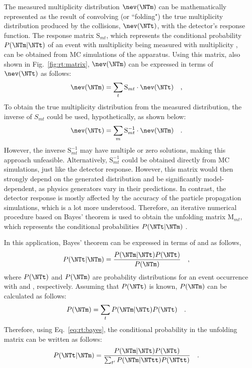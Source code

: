 The measured multiplicity distribution $\nev(\NTm)$ can be mathematically represented as the result of convolving (or ``folding") the true multiplicity distribution produced by the collisions, $\nev(\NTt)$, with the detector's response function. The response matrix $\mathrm{S}_{mt}$, which represents the conditional probability $P(\NTm | \NTt)$ of an event with multiplicity \NTt being measured with multiplicity \NTm, can be obtained from MC simulations of the apparatus. Using this matrix, also shown in Fig.~\ref{fig:rt:matrix}, $\nev(\NTm)$ can be expressed in terms of $\nev(\NTt)$ as follows:
\begin{align}
\nev(\NTm) = \sum_t \mathrm{S}_{mt} \cdot \nev(\NTt) \quad ,
\end{align}
To obtain the true multiplicity distribution from the measured distribution, the inverse of $S_{mt}$ could be used, hypothetically, as shown below:
\begin{align}
\nev ( \NTt ) = \sum_m \mathrm{S}_{mt}^{-1} \cdot \nev ( \NTm ) \quad .
\end{align}
However, the inverse $\mathrm{S}_{mt}^{-1}$ may have multiple or zero solutions, making this approach unfeasible. Alternatively, $\mathrm{S}_{mt}^{-1}$ could be obtained directly from MC simulations, just like the detector response. However, this matrix would then strongly depend on the generated \NTt distribution and be significantly model-dependent, as physics generators vary in their \NTt predictions. In contrast, the detector response is mostly affected by the accuracy of the particle propagation simulations, which is a lot more understood. Therefore, an iterative numerical procedure based on Bayes' theorem is used to obtain the unfolding matrix $\mathrm{M}_{mt}$, which represents the conditional probabilities $P(\NTt | \NTm)$ \cite{dagostini-unfolding}.

In this application, Bayes' theorem can be expressed in terms of \NTm and \NTt as follows,
\begin{align}
\label{eq:rt:bayes}
P(\NTt | \NTm) = \dfrac{P(\NTm | \NTt)P(\NTt)}{P(\NTm)} \quad ,
\end{align}
where $P(\NTt)$ and $P(\NTm)$ are probability distributions for an event occurrence with \NTt and \NTm, respectively. Assuming that $P(\NTt)$ is known, $P(\NTm)$ can be calculated as follows:
\begin{align}
P(\NTm) = \sum_t P(\NTm | \NTt) P(\NTt) \quad .
\end{align}
Therefore, using Eq.~\ref{eq:rt:bayes}, the conditional probability in the unfolding matrix can be written as follows:
\begin{align}
P(\NTt | \NTm) = \dfrac{P(\NTm | \NTt)P(\NTt)}{\sum_{t'} P(\NTm | \NTtt) P(\NTtt)} \quad .
\end{align}

